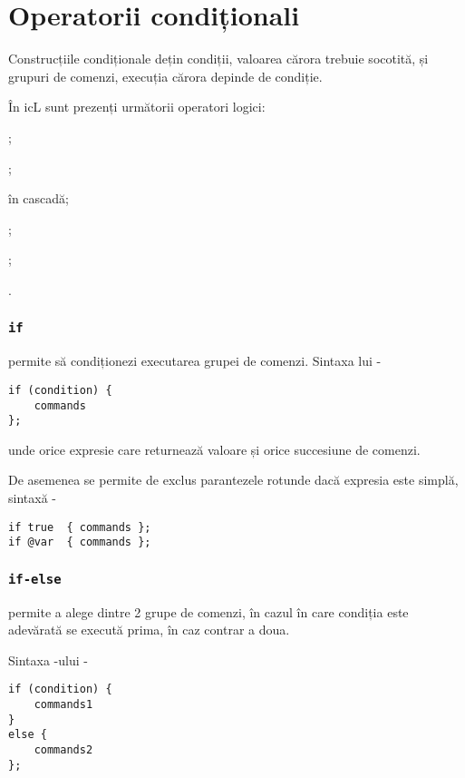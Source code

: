 \section{Operatorii condiționali}

Construcțiile condiționale dețin condiții, valoarea cărora trebuie socotită, și grupuri de comenzi, execuția cărora depinde de condiție.

În icL sunt prezenți următorii operatori logici:
\begin{icItems}
	\item {};
	\item {};
	\item {} în cascadă;
	\item {};
	\item {};
	\item {}.
\end{icItems}

\subsubsection{\lstinline|if|}

 permite să condiționezi executarea grupei de comenzi. Sintaxa lui -
\begin{lstlisting}[numbers=none]
if (condition) {
	commands
};
\end{lstlisting}
unde  orice expresie care returnează valoare \bool{} și  orice succesiune de comenzi.

De asemenea se permite de exclus parantezele rotunde dacă expresia este simplă, sintaxă -
\begin{lstlisting}[numbers=none]
if true  { commands };
if @var  { commands };
\end{lstlisting}

\subsubsection{\lstinline|if-else|}

 permite a alege dintre 2 grupe de comenzi, în cazul în care condiția este adevărată se execută prima, în caz contrar a doua.

Sintaxa -ului -
\begin{lstlisting}[numbers=none]
if (condition) {
	commands1
}
else {
	commands2
};
\end{lstlisting}


